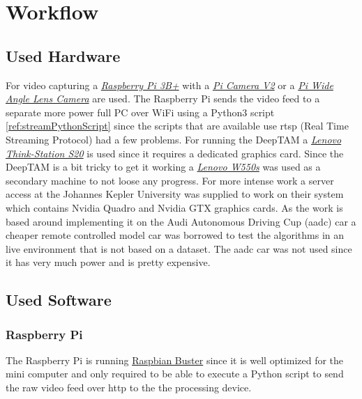 \chapter{Workflow}


\section{Used Hardware\authorA}
For video capturing a \href{https://www.raspberrypi.org/products/raspberry-pi-3-model-b-plus/}{\textit{Raspberry Pi 3B+}} with a \href{https://www.raspberrypi.org/products/camera-module-v2/}{\textit{Pi Camera V2}} or a \href{https://www.sainsmart.com/products/wide-angle-fov160-5-megapixel-camera-module-for-raspberry-pi}{\textit{Pi Wide Angle Lens Camera}} are used. The Raspberry Pi sends the video feed to a separate more power full PC over WiFi using a Python3 script \ref{ref:streamPythonScript} since the scripts that are available use \gls{rtsp} (Real Time Streaming Protocol) had a few problems. \newline
For running the DeepTAM a \href{https://support.lenovo.com/us/en/solutions/pd005642}{\textit{Lenovo Think-Station S20}} is used since it requires a dedicated graphics card. Since the DeepTAM is a bit tricky to get it working a \href{https://www.lenovo.com/de/de/laptops/thinkpad/w-series/w550s/}{\textit{Lenovo W550s}} was used as a secondary machine to not loose any progress. For more intense work a server access at the Johannes Kepler University was supplied to work on their system which contains Nvidia Quadro and Nvidia GTX graphics cards. \newline
As the work is based around implementing it on the Audi Autonomous Driving Cup (\gls{aadc}) car a cheaper remote controlled model car was borrowed to test the algorithms in an live environment that is not based on a dataset. The \gls{aadc} car was not used since it has very much power and is pretty expensive.


\section{Used Software\authorA}
\subsection{Raspberry Pi}
The Raspberry Pi is running \href{https://www.raspberrypi.org/downloads/raspbian/}{Raspbian Buster} since it is well optimized for the mini computer and only required to be able to execute a Python script to send the raw video feed over http to the the processing device.\newline
